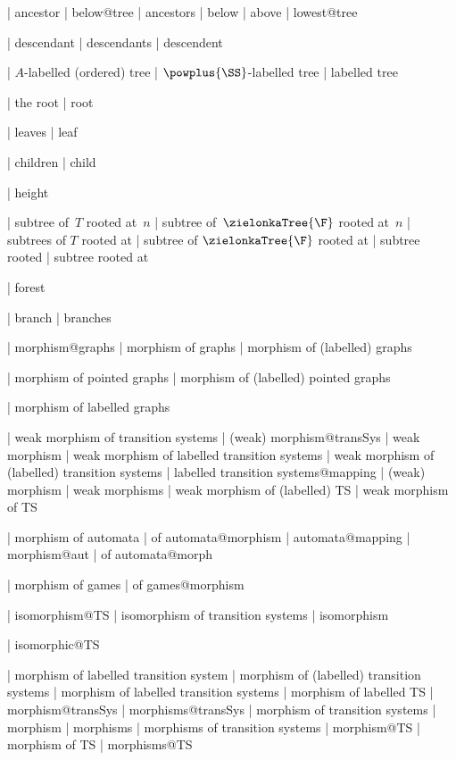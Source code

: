   | ancestor
  | below@tree
  | ancestors
  | below
  | above
  | lowest@tree

  | descendant
  | descendants
  | descendent


  | $A$-labelled (ordered) tree
  | $\powplus {\SS }$-labelled tree
  | labelled tree
  
  | the root
  | root

  | leaves
  | leaf
  
  | children
  | child
  
  | height

  | subtree of~$T$ rooted at~$n$
  | subtree of~$\zielonkaTree {\F }$ rooted at~$n$
  | subtrees of $T$ rooted at
  | subtree of $\zielonkaTree {\F }$ rooted at
  | subtree rooted
  | subtree rooted at

  | forest

  | branch
  | branches



| morphism@graphs
| morphism of graphs
| morphism of (labelled) graphs

| morphism of pointed graphs
| morphism of (labelled) pointed graphs

| morphism of labelled graphs

  | weak morphism of transition systems
  | (weak) morphism@transSys
  | weak morphism
  | weak morphism of labelled transition systems
  | weak morphism of (labelled) transition systems
  | labelled transition systems@mapping
  | (weak) morphism
  | weak morphisms
  | weak morphism of (labelled) TS
  | weak morphism of TS
  

     
   | morphism of automata
   | of automata@morphism
   | automata@mapping
   | morphism@aut
   | of automata@morph
  
   | morphism of games
   | of games@morphism  
  
  | isomorphism@TS
  | isomorphism of transition systems
  | isomorphism

  | isomorphic@TS
  
  | morphism of labelled transition system
  | morphism of (labelled) transition systems
  | morphism of labelled transition systems
  | morphism of labelled TS
  | morphism@transSys
  | morphisms@transSys
  | morphism of transition systems
  | morphism
  | morphisms
  | morphisms of transition systems
  | morphism@TS
  | morphism of TS
  | morphisms@TS

